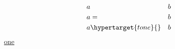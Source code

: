 \documentclass{article}
\begin{document}
\begin{eqnarray}
a &\index{alone}& b\\
a &=\index{withrel}& b\\
a &\hypertarget{tone}{}& b
\end{eqnarray}
\hyperlink{tone}{one}
\end{document}
